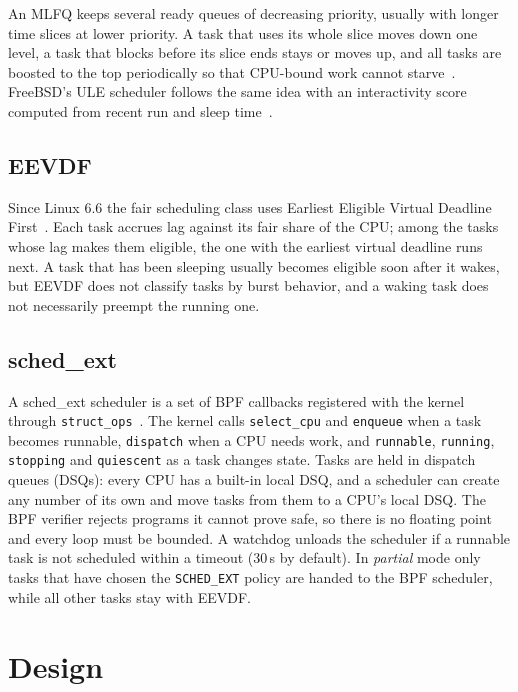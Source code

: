 \documentclass[conference]{IEEEtran}
\newcommand{\code}[1]{\texttt{\small #1}}
\begin{document}
An MLFQ keeps several ready queues of decreasing priority, usually with longer time slices at
lower priority. A task that uses its whole slice moves down one level, a task that blocks
before its slice ends stays or moves up, and all tasks are boosted to the top periodically so
that CPU-bound work cannot starve~\cite{ostep}. FreeBSD's ULE scheduler follows the same idea
with an interactivity score computed from recent run and sleep time~\cite{ule}.

\subsection{EEVDF}

Since Linux 6.6 the fair scheduling class uses Earliest Eligible Virtual Deadline
First~\cite{eevdf,eevdfdoc}. Each task accrues lag against its fair share of the CPU; among the
tasks whose lag makes them eligible, the one with the earliest virtual deadline runs next. A
task that has been sleeping usually becomes eligible soon after it wakes, but EEVDF does not
classify tasks by burst behavior, and a waking task does not necessarily preempt the running
one.

\subsection{sched\_ext}

A sched\_ext scheduler is a set of BPF callbacks registered with the kernel through
\code{struct\_ops}~\cite{schedext,bpfdoc}. The kernel calls \code{select\_cpu} and
\code{enqueue} when a task becomes runnable, \code{dispatch} when a CPU needs work, and
\code{runnable}, \code{running}, \code{stopping} and \code{quiescent} as a task changes state.
Tasks are held in dispatch queues (DSQs): every CPU has a built-in local DSQ, and a scheduler can
create any number of its own and move tasks from them to a CPU's local DSQ. The BPF verifier
rejects programs it cannot prove safe, so there is no floating point and every loop must be
bounded. A watchdog unloads the scheduler if a runnable task is not scheduled within a timeout
(30\,s by default). In \emph{partial} mode only tasks that have chosen the \code{SCHED\_EXT}
policy are handed to the BPF scheduler, while all other tasks stay with EEVDF.

\section{Design}\label{sec:design}
\end{document}
